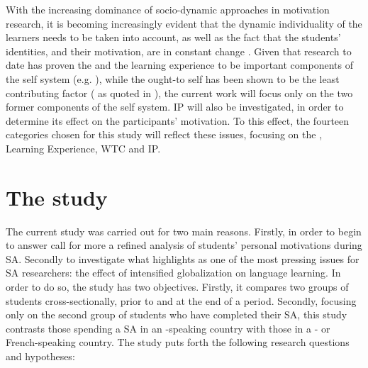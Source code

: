 \documentclass[output=paper]{langsci/langscibook}
\begin{document}
With the increasing dominance of socio-dynamic approaches in  motivation research, it is becoming increasingly evident that the dynamic individuality of the learners needs to be taken into account, as well as the fact that the students' identities, and their motivation, are in  constant change \citep{Guerrero2015}. Given that research to date has proven the  and the  learning experience to be important components of the   self system (e.g. \citealt{TaguchiEtAl2009,IslamEtAl2013,KimKim2014}), while the ought-to self has been shown to be the least contributing factor (\citealt{IslamEtAl2013,Papi2010} as quoted in  \citealt{TortCalvo2015}), the current work will focus only on the two former components of the   self system. {IP} will also be investigated, in order to determine its effect on the participants' motivation. To this effect, the fourteen categories chosen for this study will reflect these issues, focusing on the ,  Learning Experience, {WTC} and {IP}.


\section{The study}\label{sec:geoghegan:3}
\largerpage
The current study was carried out for two main reasons. Firstly, in order to begin to answer  call for more a refined analysis of students’ personal motivations during SA. Secondly to investigate what \citet{Kinginger2009} highlights as one of the most pressing issues for SA researchers: the effect of intensified globalization on language learning. In order to do so, the study has two objectives. Firstly, it compares two groups of students cross-sectionally, prior to and at the end of a  period. Secondly, focusing only on the second group of students who have completed their SA, this study contrasts those spending a SA in an -speaking country with those in a - or French-speaking country. The study puts forth the following research questions and hypotheses:
\end{document}
